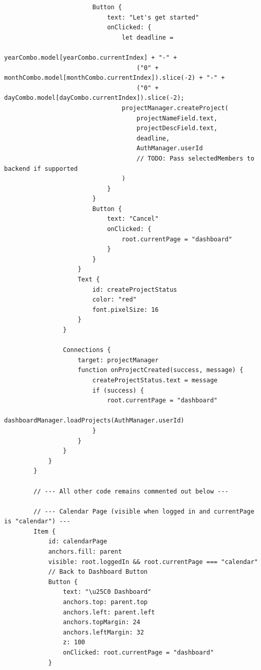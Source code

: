 \documentclass{report}
\begin{document}
\begin{lstlisting}
                        Button {
                            text: "Let's get started"
                            onClicked: {
                                let deadline =
                                    yearCombo.model[yearCombo.currentIndex] + "-" +
                                    ("0" + monthCombo.model[monthCombo.currentIndex]).slice(-2) + "-" +
                                    ("0" + dayCombo.model[dayCombo.currentIndex]).slice(-2);
                                projectManager.createProject(
                                    projectNameField.text,
                                    projectDescField.text,
                                    deadline,
                                    AuthManager.userId
                                    // TODO: Pass selectedMembers to backend if supported
                                )
                            }
                        }
                        Button {
                            text: "Cancel"
                            onClicked: {
                                root.currentPage = "dashboard"
                            }
                        }
                    }
                    Text {
                        id: createProjectStatus
                        color: "red"
                        font.pixelSize: 16
                    }
                }
    
                Connections {
                    target: projectManager
                    function onProjectCreated(success, message) {
                        createProjectStatus.text = message
                        if (success) {
                            root.currentPage = "dashboard"
                            dashboardManager.loadProjects(AuthManager.userId)
                        }
                    }
                }
            }
        }
    
        // --- All other code remains commented out below ---

        // --- Calendar Page (visible when logged in and currentPage is "calendar") ---
        Item {
            id: calendarPage
            anchors.fill: parent
            visible: root.loggedIn && root.currentPage === "calendar"
            // Back to Dashboard Button
            Button {
                text: "\u25C0 Dashboard"
                anchors.top: parent.top
                anchors.left: parent.left
                anchors.topMargin: 24
                anchors.leftMargin: 32
                z: 100
                onClicked: root.currentPage = "dashboard"
            }
        

\end{lstlisting}
\end{document}
